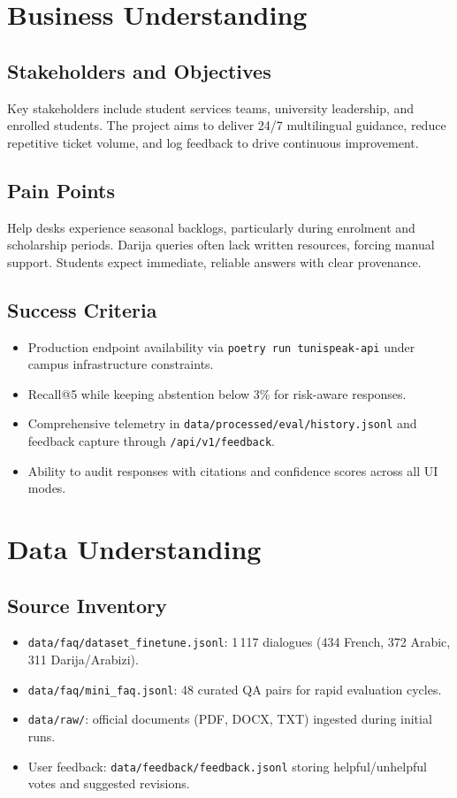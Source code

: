 \documentclass[12pt]{article}
\begin{document}
\section{Business Understanding}
\subsection{Stakeholders and Objectives}
Key stakeholders include student services teams, university leadership, and enrolled students. The project aims to deliver 24/7 multilingual guidance, reduce repetitive ticket volume, and log feedback to drive continuous improvement.

\subsection{Pain Points}
Help desks experience seasonal backlogs, particularly during enrolment and scholarship periods. Darija queries often lack written resources, forcing manual support. Students expect immediate, reliable answers with clear provenance.

\subsection{Success Criteria}
\begin{itemize}
    \item Production endpoint availability via \texttt{poetry run tunispeak-api} under campus infrastructure constraints.
    \item Recall@5  while keeping abstention below 3\% for risk-aware responses.
    \item Comprehensive telemetry in \texttt{data/processed/eval/history.jsonl} and feedback capture through \texttt{/api/v1/feedback}.
    \item Ability to audit responses with citations and confidence scores across all UI modes.
\end{itemize}

\section{Data Understanding}
\subsection{Source Inventory}
\begin{itemize}
    \item \texttt{data/faq/dataset\_finetune.jsonl}: 1\,117 dialogues (434 French, 372 Arabic, 311 Darija/Arabizi).
    \item \texttt{data/faq/mini\_faq.jsonl}: 48 curated QA pairs for rapid evaluation cycles.
    \item \texttt{data/raw/}: official documents (PDF, DOCX, TXT) ingested during initial runs.
    \item User feedback: \texttt{data/feedback/feedback.jsonl} storing helpful/unhelpful votes and suggested revisions.
\end{itemize}
\end{document}
